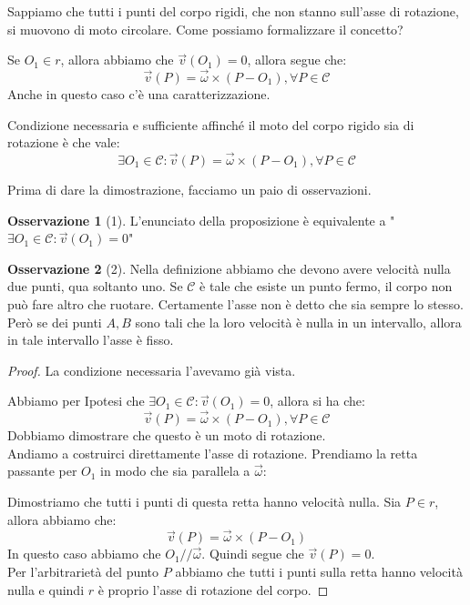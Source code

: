 \documentclass[11pt,a4paper,twoside]{article}
\theoremstyle{definition}
\newtheorem*{oss}{Osservazione}
\begin{document}
Sappiamo che tutti i punti del corpo rigidi, che non stanno sull'asse di rotazione, si muovono di moto circolare. Come possiamo formalizzare il concetto?

Se $O_1 \in r$, allora abbiamo che $\vec v(O_1) = 0$, allora segue che:
\[ \vec v(P) = \vec\omega \times (P-O_1), \forall P \in \mathscr C\]
Anche in questo caso c'è una caratterizzazione.

\begin{prop}{}{}
	Condizione necessaria e sufficiente affinché il moto del corpo rigido sia di rotazione è che vale:
	\[ \exists O_1 \in \mathscr C : \vec v(P) = \vec \omega \times (P-O_1), \forall P \in \mathscr C \]
\end{prop}

Prima di dare la dimostrazione, facciamo un paio di osservazioni.

\begin{oss}[1]
	L'enunciato della proposizione è equivalente a "$\exists O_1 \in \mathscr C: \vec v(O_1) = 0$"
\end{oss}

\begin{oss}[2]
	Nella definizione abbiamo che devono avere velocità nulla due punti, qua soltanto uno. Se $\mathscr C$ è tale che esiste un punto fermo, il corpo non può fare altro che ruotare. Certamente l'asse non è detto che sia sempre lo stesso. Però se dei punti $A, B$ sono tali che la loro velocità è nulla in un intervallo, allora in tale intervallo l'asse è fisso.
\end{oss}

\begin{proof}
	La condizione necessaria l'avevamo già vista.

	 Abbiamo per Ipotesi che $\exists O_1 \in \mathscr C : \vec v(O_1) = 0$, allora si ha che:
	\[ \vec v(P) = \vec \omega \times (P-O_1), \forall P \in \mathscr C \]
	Dobbiamo dimostrare che questo è un moto di rotazione.\\
	Andiamo a costruirci direttamente l'asse di rotazione. Prendiamo la retta passante per $O_1$ in modo che sia parallela a $\vec \omega$:
	\begin{center}
	\end{center}
	Dimostriamo che tutti i punti di questa retta hanno velocità nulla. Sia $P \in r$, allora abbiamo che:
	\[ \vec v(P) = \vec \omega \times (P-O_1) \]
	In questo caso abbiamo che $O_1 /\!/ \vec \omega$. Quindi segue che $\vec v(P)=0$.\\
	Per l'arbitrarietà del punto $P$ abbiamo che tutti i punti sulla retta hanno velocità nulla e quindi $r$ è proprio l'asse di rotazione del corpo.
\end{proof}
\end{document}
